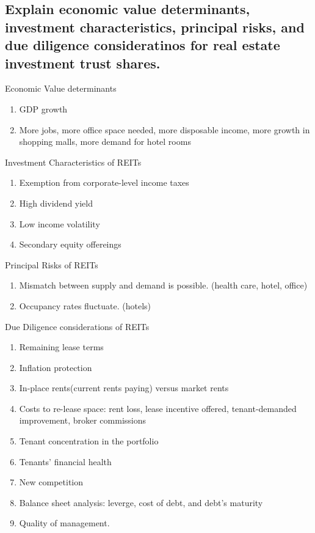 \documentclass{article}
\newcommand{\be}{\begin{enumerate}}
\newcommand{\ee}{\end{enumerate}}
\begin{document}
\subsection{Explain economic value determinants, investment characteristics, principal
risks, and due diligence consideratinos for real estate investment trust shares.}
Economic Value determinants
\be
    \item GDP growth
    \item More jobs, more office space needed, more disposable income, more growth in
    shopping malls, more demand for hotel rooms
\ee
Investment Characteristics of REITs
\be
    \item Exemption from corporate-level income taxes
    \item High dividend yield
    \item Low income volatility
    \item Secondary equity offereings
\ee
Principal Risks of REITs
\be
    \item Mismatch between supply and demand is possible. (health care, hotel, office)
    \item Occupancy rates fluctuate. (hotels)
\ee
Due Diligence considerations of REITs
\be
    \item Remaining lease terms
    \item Inflation protection
    \item In-place rents(current rents paying) versus market rents
    \item Costs to re-lease space: rent loss, lease incentive offered, tenant-demanded improvement,
    broker commissions
    \item Tenant concentration in the portfolio
    \item Tenants' financial health
    \item New competition
    \item Balance sheet analysis: leverge, cost of debt, and debt's maturity
    \item Quality of management.
\ee
\end{document}
